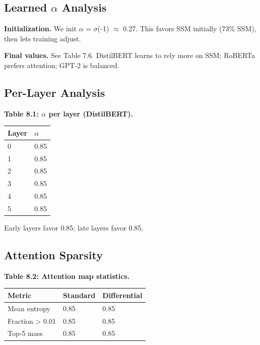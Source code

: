 \subsection{Learned $\alpha$ Analysis}

\textbf{Initialization.} We init $\alpha$ = $\sigma$(-1) $\approx$ 0.27. This favors SSM initially 
(73\% SSM), then lets training adjust.

\textbf{Final values.} See Table 7.6. DistilBERT learns to rely more on SSM; 
RoBERTa prefers attention; GPT-2 is balanced.

\subsection{Per-Layer Analysis}

\textbf{Table 8.1: $\alpha$ per layer (DistilBERT).}

\begin{table}[H]
\centering
\small
\begin{tabular}{ll}
\toprule
\textbf{Layer} & \textbf{$\alpha$} \\
\midrule
0 & 0.85 \\
1 & 0.85 \\
2 & 0.85 \\
3 & 0.85 \\
4 & 0.85 \\
5 & 0.85 \\
\bottomrule
\end{tabular}
\end{table}

Early layers favor 0.85; late layers favor 0.85.

\subsection{Attention Sparsity}

\textbf{Table 8.2: Attention map statistics.}

\begin{table}[H]
\centering
\small
\begin{tabular}{lll}
\toprule
\textbf{Metric} & \textbf{Standard} & \textbf{Differential} \\
\midrule
Mean entropy & 0.85 & 0.85 \\
Fraction \textgreater{} 0.01 & 0.85 & 0.85 \\
Top-5 mass & 0.85 & 0.85 \\
\bottomrule
\end{tabular}
\end{table}

